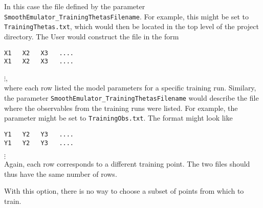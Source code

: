\documentclass[UserManual.tex]{subfiles}
\begin{document}
In this case the file defined by the parameter {\tt SmoothEmulator\_TrainingThetasFilename}. For example, this might be set to {\tt TrainingThetas.txt}, which would then be located in the top level of the project directory. The User would construct the file in the form
\vspace*{-8pt}
{\tt\begin{verbatim}
X1   X2   X3   ....
X1   X2   X3   ....
\end{verbatim}}
\vspace*{-16pt}
 \hspace*{18pt}$\vdots$,\\
where each row listed the model parameters for a specific training run. Similary, the parameter {\tt SmoothEmulator\_TrainingThetasFilename} would describe the file where the observables from the training runs were listed. For example, the parameter might be set to {\tt TrainingObs.txt}. The format might look like 
\vspace*{-8pt}
{\tt\begin{verbatim}
Y1   Y2   Y3   ....
Y1   Y2   Y3   ....
\end{verbatim}}
\vspace*{-16pt}
 \hspace*{28pt}$\vdots$\\
Again, each row corresponds to a different training point. The two files should thus have the same number of rows.

With this option, there is no way to choose a subset of points from which to train. 
\end{document}

